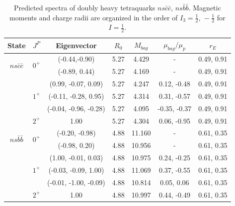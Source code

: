 \documentclass[prd,twocolumn,floatfix,nofootinbib]{revtex4}
\begin{document}
\renewcommand{\tabcolsep}{0.58cm}
\renewcommand{\arraystretch}{1.3}
\begin{table}[!htbp]
    \caption{Predicted spectra of doubly heavy tetraquarks $ns\bar{c}\bar{c}$, $ns\bar{b}\bar{b}$. 
    Magnetic moments and charge radii are organized in the order of $I_{3}=\frac{1}{2},\,-\frac{1}{2}$ for $I=\frac{1}{2}$.}
    \label{tab:2heavytetraquark1/2}
    \begin{tabular}{ccccccc}
        \hline\hline
        {\rm State}     &$J^{P}$    &{\rm Eigenvector}      &$R_{0}$    &$M_{bag}$  &$\mu_{bag}/\mu_{p}$    &$r_{E}$ \\ \hline
        \multirow{2}{*}{$ns\bar{c}\bar{c}$}
                        &\multirow{2}{*}{$0^{+}$}
                                    &(-0.44,-0.90)          &5.27	    &4.429	    &-                      &0.49, 0.91 \\ 
                        &           &(-0.89, 0.44)          &5.27	    &4.169	    &-                      &0.49, 0.91 \\ 
                        &\multirow{3}{*}{$1^{+}$}
                                    &(0.99, -0.07, 0.09)    &5.27	    &4.247	    &0.12, -0.48            &0.49, 0.91 \\ 
                        &           &(-0.11, -0.28, 0.95)   &5.27	    &4.314	    &0.31, -0.57            &0.49, 0.91 \\ 
                        &           &(-0.04, -0.96, -0.28)  &5.27	    &4.095	    &-0.35, -0.37           &0.49, 0.91 \\ 
                        &$2^{+}$    &1.00                   &5.27	    &4.304	    &0.06, -0.95            &0.49, 0.91 \\ 
        \multirow{2}{*}{$ns\bar{b}\bar{b}$}             
                        &\multirow{2}{*}{$0^{+}$}             
                                    &(-0.20, -0.98)         &4.88	    &11.160	    &-                      &0.61, 0.35 \\ 
                        &           &(-0.98, 0.20)          &4.88	    &10.956	    &-                      &0.61, 0.35 \\ 
                        &\multirow{3}{*}{$1^{+}$}
                                    &(1.00, -0.01, 0.03)    &4.88	    &10.975	    &0.24, -0.25            &0.61, 0.35 \\ 
                        &           &(-0.03, -0.09, 1.00)   &4.88	    &11.069	    &0.37, -0.55            &0.61, 0.35 \\ 
                        &           &(-0.01, -1.00, -0.09)  &4.88	    &10.814	    &0.05, 0.06             &0.61, 0.35 \\ 
                        &$2^{+}$    &1.00                   &4.88	    &10.997	    &0.44, -0.49            &0.61, 0.35 \\ 


\end{tabular}
\end{table}
\end{document}
